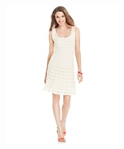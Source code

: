 \documentclass[11pt]{article}
\begin{document}
\begin{figure}
\begin{subfigure}{.18\textwidth}
\includegraphics[width=\linewidth]{concepts/concept1_pos5.jpg}
\label{fig:sub2}
\end{subfigure}


\end{figure}
\end{document}
